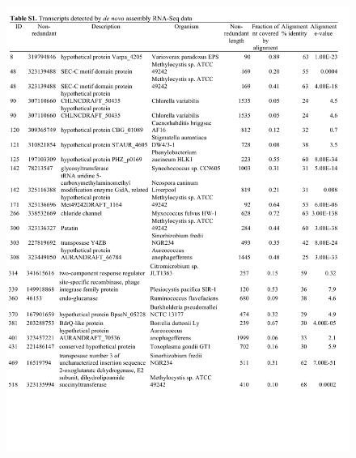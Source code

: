 \begin{figure}[H]
\centering
    \includegraphics[width=1.0\textwidth]{./tex/chapter1/figures/supplemental/TableS1a.pdf}
\end{figure}
